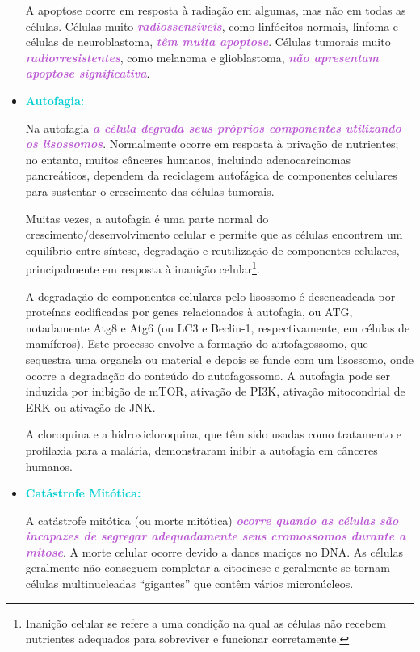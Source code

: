 \documentclass[11pt,a4paper]{article}
\begin{document}
\begin{itemize}[label=\textcolor{CarnationPink}{$\blacktriangleright$}]
		A apoptose ocorre em resposta à radiação em algumas, mas não em todas as células. Células muito \textcolor{MediumOrchid}{\textbf{\textit{radiossensíveis}}}, como linfócitos normais, linfoma e células de neuroblastoma, \textcolor{MediumOrchid}{\textbf{\textit{têm muita apoptose}}}. Células tumorais muito \textcolor{MediumOrchid}{\textbf{\textit{radiorresistentes}}}, como melanoma e glioblastoma, \textcolor{MediumOrchid}{\textbf{\textit{não apresentam apoptose significativa}}}.


		\item \textcolor{DarkTurquoise}{\LobsterTwo\Large\textbf{Autofagia:}}
		
		Na autofagia \textcolor{MediumOrchid}{\textbf{\textit{a célula degrada seus próprios componentes utilizando os lisossomos}}}. Normalmente ocorre em resposta à privação de nutrientes; no entanto, muitos cânceres humanos, incluindo adenocarcinomas pancreáticos, dependem da reciclagem autofágica de componentes celulares para sustentar o crescimento das células tumorais.

		Muitas vezes, a autofagia é uma parte normal do crescimento/desenvolvimento celular e permite que as células encontrem um equilíbrio entre síntese, degradação e reutilização de componentes celulares, principalmente em resposta à inanição celular\footnote{Inanição celular se refere a uma condição na qual as células não recebem nutrientes adequados para sobreviver e funcionar corretamente.}.

		A degradação de componentes celulares pelo lisossomo é desencadeada por proteínas codificadas por genes relacionados à autofagia, ou ATG, notadamente Atg8 e Atg6 (ou LC3 e Beclin-1, respectivamente, em células de mamíferos). Este processo envolve a formação do autofagossomo, que sequestra uma organela ou material e depois se funde com um lisossomo, onde ocorre a degradação do conteúdo do autofagossomo. A autofagia pode ser induzida por inibição de mTOR, ativação de PI3K, ativação mitocondrial de ERK ou ativação de JNK.

		A cloroquina e a hidroxicloroquina, que têm sido usadas como tratamento e profilaxia para a malária, demonstraram inibir a autofagia em cânceres humanos.

		\item \textcolor{DarkTurquoise}{\LobsterTwo\Large\textbf{Catástrofe Mitótica:}}
		
		A catástrofe mitótica (ou morte mitótica) \textcolor{MediumOrchid}{\textbf{\textit{ocorre quando as células são incapazes de segregar adequadamente seus cromossomos durante a mitose}}}. A morte celular ocorre devido a danos maciços no DNA. As células geralmente não conseguem completar a citocinese e geralmente se tornam células multinucleadas “gigantes” que contêm vários micronúcleos.


\end{itemize}
\end{document}
